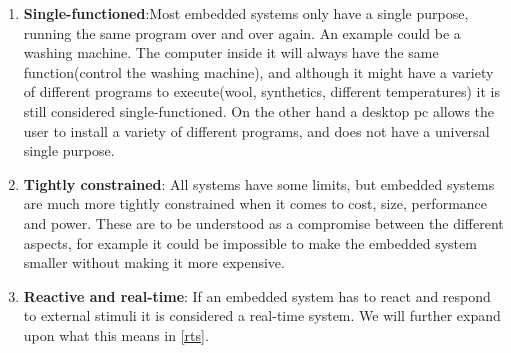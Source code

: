 \begin{enumerate}
  \item \textbf{Single-functioned}:Most embedded systems only have a single purpose, running the same program over and over again. An example could be a washing machine. The computer inside it will always have the same function(control the washing machine), and although it might have a variety of different programs to execute(wool, synthetics, different temperatures) it is still considered single-functioned. On the other hand a desktop pc allows the user to install a variety of different programs, and does not have a universal single purpose.
  \item \textbf{Tightly constrained}: All systems have some limits, but
  embedded systems are much more tightly constrained when it comes to cost,
  size, performance and power. These are to be understood as a compromise between the different aspects, for example it could be impossible to make the embedded system smaller without making it more expensive. 
  \item \textbf{Reactive and real-time}: If an embedded system has to react and respond to external stimuli it is considered a real-time system. We will further expand upon what this means in \autoref{rts}.
\end{enumerate}
